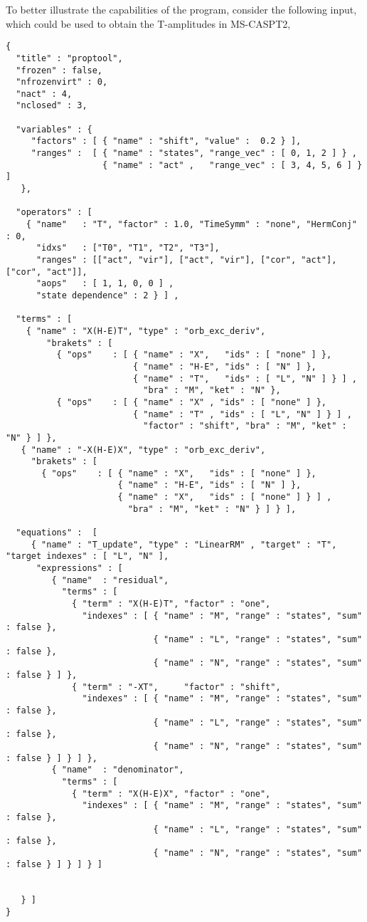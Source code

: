 To better illustrate the capabilities of the program, 
consider the following input, which could be used to 
obtain the T-amplitudes in MS-CASPT2, 
\begin{lstlisting}[label={lst:input}]
{
  "title" : "proptool",
  "frozen" : false,
  "nfrozenvirt" : 0,
  "nact" : 4,
  "nclosed" : 3,

  "variables" : {
     "factors" : [ { "name" : "shift", "value" :  0.2 } ],
     "ranges" :  [ { "name" : "states", "range_vec" : [ 0, 1, 2 ] } ,
                   { "name" : "act" ,   "range_vec" : [ 3, 4, 5, 6 ] } ]
   },

  "operators" : [
    { "name"   : "T", "factor" : 1.0, "TimeSymm" : "none", "HermConj" : 0,
      "idxs"   : ["T0", "T1", "T2", "T3"],
      "ranges" : [["act", "vir"], ["act", "vir"], ["cor", "act"], ["cor", "act"]],
      "aops"   : [ 1, 1, 0, 0 ] ,
      "state dependence" : 2 } ] ,

  "terms" : [
    { "name" : "X(H-E)T", "type" : "orb_exc_deriv",
        "brakets" : [
          { "ops"    : [ { "name" : "X",   "ids" : [ "none" ] },
                         { "name" : "H-E", "ids" : [ "N" ] },
                         { "name" : "T",   "ids" : [ "L", "N" ] } ] ,
                           "bra" : "M", "ket" : "N" }, 
          { "ops"    : [ { "name" : "X" , "ids" : [ "none" ] },
                         { "name" : "T" , "ids" : [ "L", "N" ] } ] ,
                           "factor" : "shift", "bra" : "M", "ket" : "N" } ] },
   { "name" : "-X(H-E)X", "type" : "orb_exc_deriv",
     "brakets" : [
       { "ops"    : [ { "name" : "X",   "ids" : [ "none" ] },
                      { "name" : "H-E", "ids" : [ "N" ] },
                      { "name" : "X",   "ids" : [ "none" ] } ] ,
                        "bra" : "M", "ket" : "N" } ] } ],

  "equations" :  [
     { "name" : "T_update", "type" : "LinearRM" , "target" : "T", "target indexes" : [ "L", "N" ],
      "expressions" : [
         { "name"  : "residual",
           "terms" : [
             { "term" : "X(H-E)T", "factor" : "one",
               "indexes" : [ { "name" : "M", "range" : "states", "sum" : false },
                             { "name" : "L", "range" : "states", "sum" : false },
                             { "name" : "N", "range" : "states", "sum" : false } ] },
             { "term" : "-XT",     "factor" : "shift",
               "indexes" : [ { "name" : "M", "range" : "states", "sum" : false },
                             { "name" : "L", "range" : "states", "sum" : false },
                             { "name" : "N", "range" : "states", "sum" : false } ] } ] },
         { "name"  : "denominator",
           "terms" : [
             { "term" : "X(H-E)X", "factor" : "one",                                                 
               "indexes" : [ { "name" : "M", "range" : "states", "sum" : false },
                             { "name" : "L", "range" : "states", "sum" : false },
                             { "name" : "N", "range" : "states", "sum" : false } ] } ] } ]
                      
                      
   } ]
}                        
                         
\end{lstlisting}         
